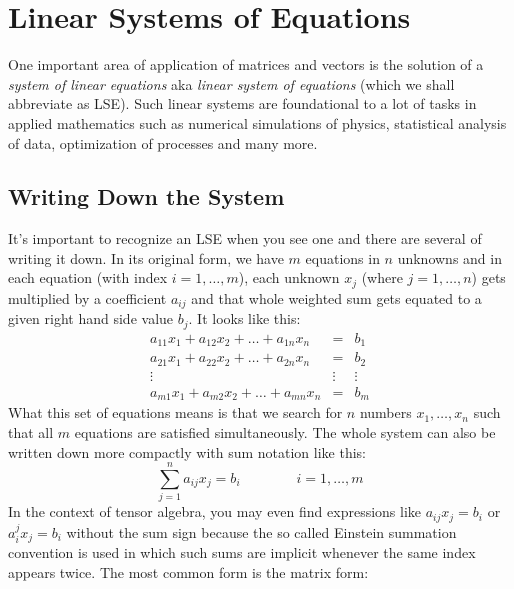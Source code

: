 \section{Linear Systems of Equations}
One important area of application of matrices and vectors is the solution of a \emph{system of linear equations} aka \emph{linear system of equations} (which we shall abbreviate as LSE). Such linear systems are foundational to a lot of tasks in applied mathematics such as numerical simulations of physics, statistical analysis of data, optimization of processes and many more. 

\subsection{Writing Down the System}
It's important to recognize an LSE when you see one and there are several of writing it down. In its original form, we have  $m$ equations in $n$ unknowns and in each equation (with index $i = 1,\ldots, m$), each unknown $x_j$ (where $j=1,\ldots,n$) gets multiplied by a coefficient $a_{ij}$ and that whole weighted sum gets equated to a given right hand side value $b_j$. It looks like this:
\begin{eqnarray}
a_{11} x_1 + a_{12} x_2 + \ldots + a_{1n} x_n &=& b_1    \\
a_{21} x_1 + a_{22} x_2 + \ldots + a_{2n} x_n &=& b_2    \\
                                       \vdots &\vdots& \vdots \\
a_{m1} x_1 + a_{m2} x_2 + \ldots + a_{mn} x_n &=& b_m 
\end{eqnarray}
What this set of equations means is that we search for $n$ numbers $x_1, \ldots, x_n$ such that all $m$ equations are satisfied simultaneously. The whole system can also be written down more compactly with sum notation like this:
\begin{equation}
\sum_{j=1}^n a_{ij} x_j = b_i \qquad \qquad i=1, \ldots, m
\end{equation}
In the context of tensor algebra, you may even find expressions like $a_{ij} x_j = b_i$ or $a_i^j x_j = b_i$ without the sum sign because the so called Einstein summation convention is used in which such sums are implicit whenever the same index appears twice. The most common form is the matrix form:
